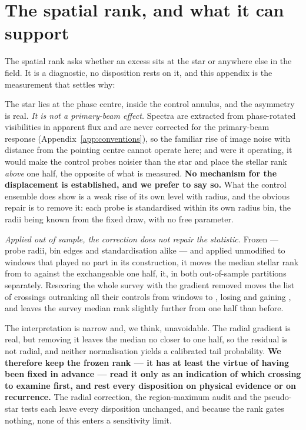 \section{The spatial rank, and what it can support}
\label{app:radius}

The spatial rank asks whether an excess sits at the star or anywhere else in
the field. It is a diagnostic, no disposition rests on it, and this appendix
is the measurement that settles why: \rankstatus{}

The star lies at the phase centre, inside the control annulus, and the
asymmetry is real. \emph{It is not a primary-beam effect.} Spectra are
extracted from phase-rotated visibilities in apparent flux and are never
corrected for the primary-beam response (Appendix~\ref{app:conventions}), so
the familiar rise of image noise with distance from the pointing centre
cannot operate here; and were it operating, it would make the control probes
noisier than the star and place the stellar rank \emph{above} one half, the
opposite of what is measured. \textbf{No mechanism for the displacement is
established, and we prefer to say so.} What the control ensemble does show is
a weak rise of its own level with radius, and the obvious repair is to remove
it: each probe is standardised within its own radius bin, the radii being
known from the fixed draw, with no free parameter.

\emph{Applied out of sample, the correction does not repair the statistic.}
Frozen --- probe radii, bin edges and standardisation alike --- and applied
unmodified to \RadValStarN{} windows that played no part in its construction,
it moves the median stellar rank from \RadValStarRawMed{} to
\RadValStarCorMed{} against the exchangeable one half, \RadValStarToward{}
it, in both out-of-sample partitions separately. Rescoring the whole survey
with the gradient removed moves the list of crossings outranking all their
controls from \LocStageGlobal{} windows to \LocStageLocal, losing
\LocStageLost{} and gaining \LocStageGained, and leaves the survey median
rank slightly further from one half than before.

The interpretation is narrow and, we think, unavoidable. The radial gradient
is real, but removing it leaves the median no closer to one half, so the
residual is not radial, and neither normalisation yields a calibrated tail
probability. \textbf{We therefore keep the frozen rank --- it has at least
the virtue of having been fixed in advance --- read it only as an indication
of which crossing to examine first, and rest every disposition on physical
evidence or on recurrence.} The radial correction, the region-maximum audit
and the pseudo-star tests each leave every disposition unchanged, and because
the rank gates nothing, none of this enters a sensitivity limit.

